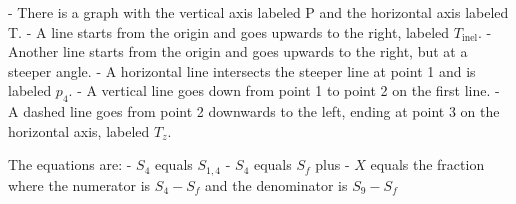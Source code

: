 - There is a graph with the vertical axis labeled P and the horizontal axis labeled T.
- A line starts from the origin and goes upwards to the right, labeled \( T_{\text{inel}} \).
- Another line starts from the origin and goes upwards to the right, but at a steeper angle.
- A horizontal line intersects the steeper line at point 1 and is labeled \( p_4 \).
- A vertical line goes down from point 1 to point 2 on the first line.
- A dashed line goes from point 2 downwards to the left, ending at point 3 on the horizontal axis, labeled \( T_z \).

The equations are:
- \( S_4 \) equals \( S_{1,4} \)
- \( S_4 \) equals \( S_f \) plus
- \( X \) equals the fraction where the numerator is \( S_4 - S_f \) and the denominator is \( S_9 - S_f \)
